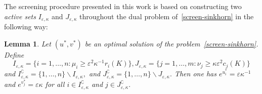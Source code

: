 \documentclass{article}
\newtheorem{lemma}{Lemma}
\begin{document}
The screening procedure presented in this work is based on constructing two \emph{active sets} $I_{\varepsilon, \kappa}$ and $J_{\varepsilon, \kappa}$ throughout the dual problem of~\eqref{screen-sinkhorn} in the following way:

\begin{lemma}
\label{lemma_actives_sets}
Let $(u^{*}, v^{*})$ be an optimal solution of the problem~\eqref{screen-sinkhorn}. 
Define
\begin{equation*}
\label{I_c_epsilon}
I_{\varepsilon,\kappa} = \Big\{i=1, \ldots, n: \mu_i \geq {\varepsilon^2} \kappa^{-1} r_i(K)\Big\}, J_{\varepsilon,\kappa} = \Big\{j=1, \ldots, m: \nu_j \geq \kappa{\varepsilon^2}{} c_j(K)\Big\}
\end{equation*}
and $I^\complement_{\varepsilon,\kappa} = \{1, \ldots, n\} \backslash I_{\varepsilon, \kappa},$ and $J^\complement_{\varepsilon,\kappa} = \{1, \ldots, n\} \backslash J_{\varepsilon, \kappa}.$
Then one has $e^{u^{*}_i} = \varepsilon\kappa^{-1}$ and $e^{v^{*}_j} = \varepsilon\kappa$ for all $i \in I^\complement_{\varepsilon,\kappa} $ and $j\in J^\complement_{\varepsilon,\kappa} .$
\end{lemma}
\end{document}
